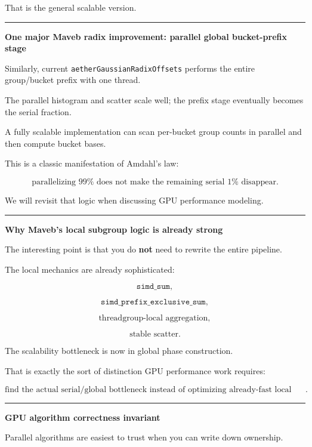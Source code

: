 That is the general scalable version.

\begin{center}\rule{0.5\linewidth}{0.5pt}\end{center}

\textbf{One major Maveb radix improvement: parallel global bucket-prefix stage}

Similarly, current \texttt{aetherGaussianRadixOffsets} performs the entire group/bucket prefix with one thread.

The parallel histogram and scatter scale well; the prefix stage eventually becomes the serial fraction.

A fully scalable implementation can scan per-bucket group counts in parallel and then compute bucket bases.

This is a classic manifestation of Amdahl's law:

\[
\boxed{
\text{parallelizing 99%
}
\]

We will revisit that logic when discussing GPU performance modeling.

\begin{center}\rule{0.5\linewidth}{0.5pt}\end{center}

\textbf{Why Maveb's local subgroup logic is already strong}

The interesting point is that you do \textbf{not} need to rewrite the entire pipeline.

The local mechanics are already sophisticated:

\[
\texttt{simd_sum},
\]

\[
\texttt{simd_prefix_exclusive_sum},
\]

\[
\text{threadgroup-local aggregation},
\]

\[
\text{stable scatter}.
\]

The scalability bottleneck is now in global phase construction.

That is exactly the sort of distinction GPU performance work requires:

\[
\boxed{
\text{find the actual serial/global bottleneck instead of optimizing already-fast local math}.
}
\]

\begin{center}\rule{0.5\linewidth}{0.5pt}\end{center}

\textbf{GPU algorithm correctness invariant}

Parallel algorithms are easiest to trust when you can write down ownership.

